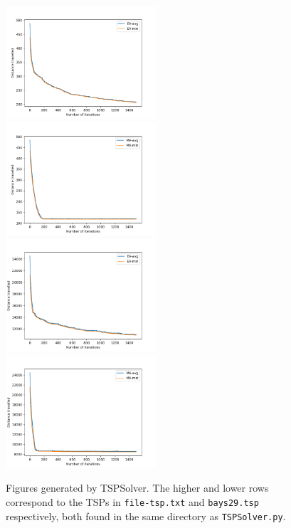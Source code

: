 \documentclass{scrartcl}
\begin{document}
\begin{figure}[ht!]

\includegraphics[width=0.5\textwidth]{6/6bEA}
\includegraphics[width=0.5\textwidth]{6/6bMA}
\includegraphics[width=0.5\textwidth]{6/6bEA_SYM}
\includegraphics[width=0.5\textwidth]{6/6bMA_SYM}

\caption{Figures generated by TSPSolver. The higher and lower rows correspond to the TSPs in \texttt{file-tsp.txt} and \texttt{bays29.tsp} respectively, both found in the same directory as \texttt{TSPSolver.py}.\label{fig:6}}
\end{figure}
\end{document}
